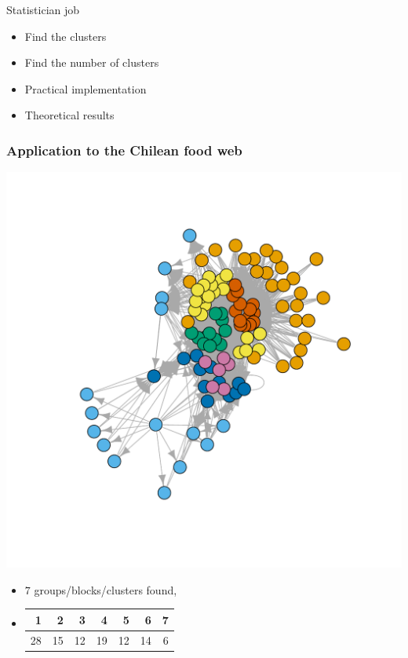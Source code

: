 \documentclass[nopagenumber,9pt]{beamer}
\begin{document}
\begin{frame}
\begin{block}{Statistician job}
\begin{itemize}
\item Find the clusters
\item Find the number of clusters
\item Practical implementation
\item Theoretical results
\end{itemize}
\end{block}

\end{frame}


\begin{frame}
 \frametitle{Application to the Chilean food web}
 
 \begin{center}
  \includegraphics[scale=.3]{plots/chilean_sbm.pdf}
 \end{center}

 \begin{itemize}
 \item $7$ groups/blocks/clusters found,
 \item \begin{tabular}{rrrrrrr}
  \hline
  1 & 2 & 3 & 4 & 5 & 6 & 7 \\ 
  \hline
  28 &  15 &  12 &  19 &  12 &  14 &   6 \\ 
   \hline
\end{tabular}
\end{itemize}


\end{frame}
\end{document}
